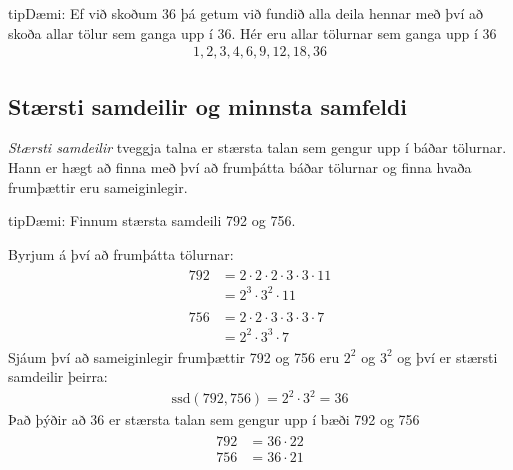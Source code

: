 \documentclass[a4paper,10pt,icelandic]{sphinxmanual}
\begin{document}
\begin{sphinxadmonition}{tip}{Dæmi:}
Ef við skoðum \(36\) þá getum við fundið alla deila hennar með því að skoða allar tölur sem ganga upp í \(36\).
Hér eru allar tölurnar sem ganga upp í \(36\)
\begin{equation*}
\begin{split}{1, 2, 3, 4, 6, 9, 12, 18, 36}\end{split}
\end{equation*}\end{sphinxadmonition}


\subsection{Stærsti samdeilir og minnsta samfeldi}
\label{\detokenize{Kafli01:staersti-samdeilir-og-minnsta-samfeldi}}
\textit{Stærsti samdeilir} tveggja talna er stærsta talan sem gengur upp í báðar tölurnar.
Hann er hægt að finna með því að frumþátta báðar tölurnar og finna hvaða frumþættir eru sameiginlegir.

\begin{sphinxadmonition}{tip}{Dæmi:}
Finnum stærsta samdeili 792 og 756.


Byrjum á því að frumþátta tölurnar:
\begin{equation*}
\begin{split}\begin{aligned}
792 &= 2\cdot 2\cdot 2\cdot 3\cdot 3\cdot 11 \\
&= 2^3\cdot 3^2\cdot 11  \\
& \\
756 &= 2\cdot 2\cdot 3\cdot 3\cdot 3\cdot 7 \\
&= 2^2\cdot 3^3 \cdot 7
\end{aligned}\end{split}
\end{equation*}
Sjáum því að sameiginlegir frumþættir 792 og 756 eru \(2^2\) og \(3^2\) og því er stærsti samdeilir þeirra:
\begin{equation*}
\begin{split}\text{ssd}(792,756) = 2^2 \cdot 3^2 = 36\end{split}
\end{equation*}
Það þýðir að 36 er stærsta talan sem gengur upp í bæði 792 og 756
\begin{equation*}
\begin{split}\begin{aligned}
792&=36\cdot 22 \\
756&=36\cdot 21
\end{aligned}\end{split}
\end{equation*}\end{sphinxadmonition}
\end{document}
